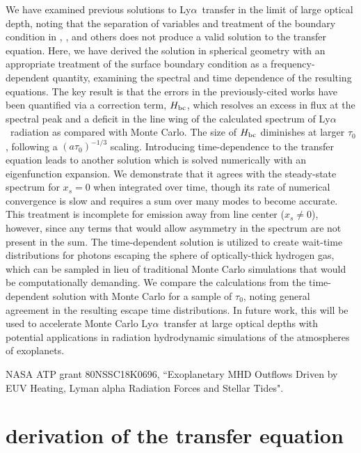 \documentclass{aastex63}
\newcommand\lya{Ly$\alpha$\ }
\begin{document}
We have examined previous solutions to \lya transfer in the limit of large optical depth, noting that the separation of variables and treatment of the boundary condition in \cite{1973MNRAS.162...43H}, \cite{1990ApJ...350..216N}, \cite{2006ApJ...649...14D} and others does not produce a valid solution to the transfer equation. Here, we have derived the solution in spherical geometry with an appropriate treatment of the surface boundary condition as a frequency-dependent quantity, examining the spectral and time dependence of the resulting equations. The key result is that the errors in the previously-cited works have been quantified via a correction term, $H_{\rm bc}$, which resolves an excess in flux at the spectral peak and a deficit in the line wing of the calculated spectrum of \lya radiation as compared with Monte Carlo. The size of $H_{\rm bc}$ diminishes at larger $\tau_0$, following a $(a\tau_0)^{-1/3}$ scaling. Introducing time-dependence to the transfer equation leads to another solution which is solved numerically with an eigenfunction expansion. We demonstrate that it agrees with the steady-state spectrum for $x_s=0$ when integrated over time, though its rate of numerical convergence is slow and requires a sum over many modes to become accurate. This treatment is incomplete for emission away from line center ($x_s\neq0$), however, since any terms that would allow asymmetry in the spectrum are not present in the sum. The time-dependent solution is utilized to create wait-time distributions for photons escaping the sphere of optically-thick hydrogen gas, which can be sampled in lieu of traditional Monte Carlo simulations that would be computationally demanding. We compare the calculations from the time-dependent solution with Monte Carlo for a sample of $\tau_0$, noting general agreement in the resulting escape time distributions. In future work, this will be used to accelerate Monte Carlo \lya transfer at large optical depths with potential applications in radiation hydrodynamic simulations of the atmospheres of exoplanets.

\acknowledgments

NASA ATP grant 80NSSC18K0696, ``Exoplanetary MHD Outflows Driven by EUV Heating, Lyman alpha Radiation Forces and Stellar Tides".
\restartappendixnumbering

\appendix
\section{ derivation of the transfer equation } \label{app:rteqn_derivation}
\end{document}
